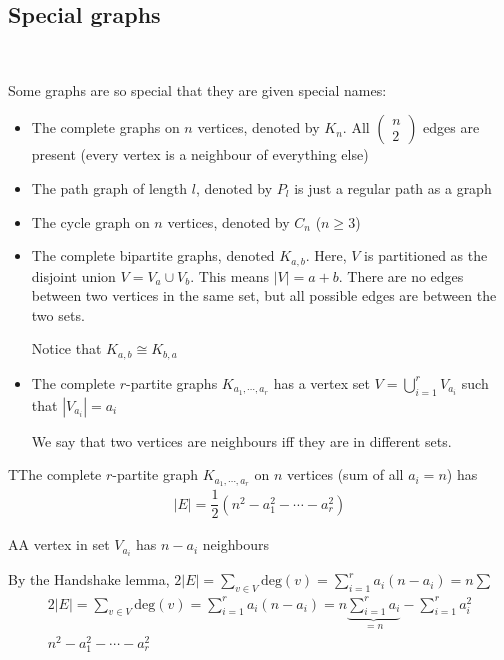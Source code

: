 \subsection{Special graphs}\hfill\\\par
\noindent Some graphs are so special that they are given special names:\par
\begin{itemize}
  \item The complete graphs on $n$ vertices, denoted by $K_n$. All $\begin{pmatrix}n\\2\end{pmatrix}$ edges are present (every vertex is a neighbour of everything else)
  \item The path graph of length $l$, denoted by $P_l$ is just a regular path as a graph
  \item The cycle graph on $n$ vertices, denoted by $C_n$ ($n\geq3$)
  \item The complete bipartite graphs, denoted $K_{a,b}$. Here, $V$ is partitioned as the disjoint union $V = V_a\cup V_b$. This means $\left|V\right| = a+b$. There are no edges between two vertices in the same set, but all possible edges are between the two sets.\par
    Notice that $K_{a,b}\cong K_{b,a}$
  \item The complete $r$-partite graphs $K_{a_1,\cdots,a_r}$ has a vertex set $V = \bigcup_{i=1}^{r}V_{a_i}$ such that $\left|V_{a_i}\right| = a_i$\par
    We say that two vertices are neighbours iff they are in different sets.
\end{itemize}
\par\bigskip
\begin{lem}
  TThe complete $r$-partite graph $K_{a_1,\cdots,a_r}$ on $n$ vertices (sum of all $a_i = n$) has
  \begin{equation*}
    \begin{gathered}
      \left|E\right| = \dfrac{1}{2}(n^2-a_1^2-\cdots-a_r^2)
    \end{gathered}
  \end{equation*}
\end{lem}
\par\bigskip
\begin{prf}
  AA vertex in set $V_{a_i}$ has $n-a_i$ neighbours\par
  \noindent By the Handshake lemma, $2\left|E\right|= \sum_{v\in V}\text{deg}(v) = \sum_{i=1}^{r}a_i(n-a_i) = n\sum_{}^{}$
  \begin{equation*}
    \begin{gathered}
      2\left|E\right|= \sum_{v\in V}\text{deg}(v) = \sum_{i=1}^{r}a_i(n-a_i) = n\underbrace{\sum_{i=1}^{r}a_i}_{\text{$=n$}}-\sum_{i=1}^{r}a_i^2\\
      n^2-a_1^2-\cdots-a_r^2
    \end{gathered}
  \end{equation*}
\end{prf}
